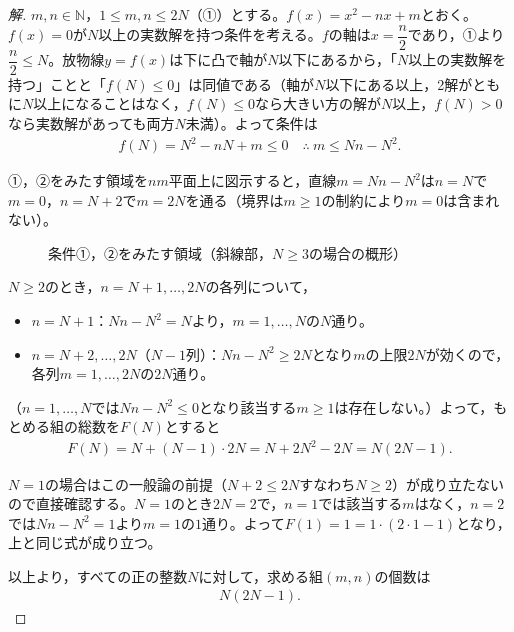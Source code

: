 \documentclass[../main.tex]{subfiles}
\begin{document}
\begin{proof}[解]
  $m,n\in\mathbb N$，$1\le m,n\le2N$（①）とする。$f(x)=x^2-nx+m$とおく。$f(x)=0$が$N$以上の実数解を持つ条件を考える。$f$の軸は$x=\dfrac n2$であり，①より$\dfrac n2\le N$。放物線$y=f(x)$は下に凸で軸が$N$以下にあるから，「$N$以上の実数解を持つ」ことと「$f(N)\le0$」は同値である（軸が$N$以下にある以上，2解がともに$N$以上になることはなく，$f(N)\le0$なら大きい方の解が$N$以上，$f(N)>0$なら実数解があっても両方$N$未満）。よって条件は
  \begin{align*}
    f(N)=N^2-nN+m\le0\quad\therefore\ m\le Nn-N^2.\tag{②}
  \end{align*}

  ①，②をみたす領域を$nm$平面上に図示すると，直線$m=Nn-N^2$は$n=N$で$m=0$，$n=N+2$で$m=2N$を通る（境界は$m\ge1$の制約により$m=0$は含まれない）。

  \begin{figure}[htb]
    \centering
    \caption{条件①，②をみたす領域（斜線部，$N\ge3$の場合の概形）}
  \end{figure}

  $N\ge2$のとき，$n=N+1,\dots,2N$の各列について，
  \begin{itemize}
    \item $n=N+1$：$Nn-N^2=N$より，$m=1,\dots,N$の$N$通り。
    \item $n=N+2,\dots,2N$（$N-1$列）：$Nn-N^2\ge2N$となり$m$の上限$2N$が効くので，各列$m=1,\dots,2N$の$2N$通り。
  \end{itemize}
  （$n=1,\dots,N$では$Nn-N^2\le0$となり該当する$m\ge1$は存在しない。）よって，もとめる組の総数を$F(N)$とすると
  \begin{align*}
    F(N)=N+(N-1)\cdot2N=N+2N^2-2N=N(2N-1).
  \end{align*}

  $N=1$の場合はこの一般論の前提（$N+2\le2N$すなわち$N\ge2$）が成り立たないので直接確認する。$N=1$のとき$2N=2$で，$n=1$では該当する$m$はなく，$n=2$では$Nn-N^2=1$より$m=1$の$1$通り。よって$F(1)=1=1\cdot(2\cdot1-1)$となり，上と同じ式が成り立つ。

  以上より，すべての正の整数$N$に対して，求める組$(m,n)$の個数は
  \begin{align*}
    N(2N-1).
  \end{align*}
\end{proof}
\end{document}
